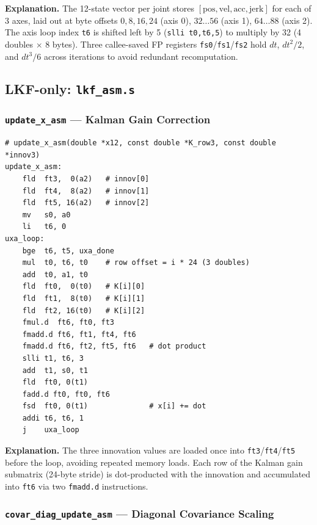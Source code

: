 \documentclass[12pt,a4paper]{article}
\newcommand{\reg}[1]{\texttt{\color{reg}#1}}
\newcommand{\insn}[1]{\texttt{\color{keyword}#1}}
\newcommand{\func}[1]{\texttt{\bfseries #1}}
\begin{document}
\textbf{Explanation.}
The 12-state vector per joint stores $[\text{pos}, \text{vel},
\text{acc}, \text{jerk}]$ for each of 3 axes, laid out at byte
offsets $0, 8, 16, 24$ (axis 0), $32 \ldots 56$ (axis 1), $64 \ldots
88$ (axis 2).  The axis loop index \reg{t6} is shifted left by 5
(\insn{slli t0,t6,5}) to multiply by 32 (4 doubles $\times$ 8
bytes). Three callee-saved FP registers \reg{fs0}/\reg{fs1}/\reg{fs2}
hold $dt$, $dt^2/2$, and $dt^3/6$ across iterations to avoid
redundant recomputation.

\subsection{LKF-only: \texttt{lkf\_asm.s}}

\subsubsection{\func{update\_x\_asm} --- Kalman Gain Correction}

\begin{lstlisting}[caption={\func{update\_x\_asm}: $x_{12} += K_{12\times3} \cdot \text{innov}_3$},label=lst:updatex]
# update_x_asm(double *x12, const double *K_row3, const double *innov3)
update_x_asm:
    fld  ft3,  0(a2)   # innov[0]
    fld  ft4,  8(a2)   # innov[1]
    fld  ft5, 16(a2)   # innov[2]
    mv   s0, a0
    li   t6, 0
uxa_loop:
    bge  t6, t5, uxa_done
    mul  t0, t6, t0    # row offset = i * 24 (3 doubles)
    add  t0, a1, t0
    fld  ft0,  0(t0)   # K[i][0]
    fld  ft1,  8(t0)   # K[i][1]
    fld  ft2, 16(t0)   # K[i][2]
    fmul.d  ft6, ft0, ft3
    fmadd.d ft6, ft1, ft4, ft6
    fmadd.d ft6, ft2, ft5, ft6   # dot product
    slli t1, t6, 3
    add  t1, s0, t1
    fld  ft0, 0(t1)
    fadd.d ft0, ft0, ft6
    fsd  ft0, 0(t1)              # x[i] += dot
    addi t6, t6, 1
    j    uxa_loop
\end{lstlisting}

\textbf{Explanation.}
The three innovation values are loaded once into
\reg{ft3}/\reg{ft4}/\reg{ft5} before the loop, avoiding repeated
memory loads. Each row of the Kalman gain submatrix (24-byte stride)
is dot-producted with the innovation and accumulated into \reg{ft6}
via two \insn{fmadd.d} instructions.

\subsubsection{\func{covar\_diag\_update\_asm} --- Diagonal Covariance Scaling}
\end{document}
